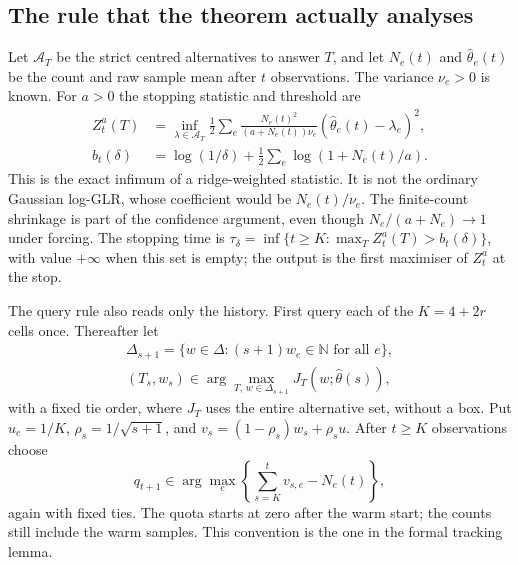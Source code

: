 \subsection{The rule that the theorem actually analyses}
Let $\mathcal A_T$ be the strict centred alternatives to answer $T$, and let $N_e(t)$ and
$\widehat\theta_e(t)$ be the count and raw sample mean after $t$ observations. The variance
$\nu_e>0$ is known. For $a>0$ the stopping statistic and threshold are
\begin{align}
Z_t^a(T)&=\inf_{\lambda\in\mathcal A_T}
 \frac12\sum_e\frac{N_e(t)^2}{(a+N_e(t))\nu_e}
 (\widehat\theta_e(t)-\lambda_e)^2,\label{eq:ridgestop}\\
b_t(\delta)&=\log(1/\delta)+\frac12\sum_e\log(1+N_e(t)/a).
\label{eq:idealboundary}
\end{align}
This is the exact infimum of a ridge-weighted statistic. It is not the ordinary Gaussian
log-GLR, whose coefficient would be $N_e(t)/\nu_e$. The finite-count shrinkage is part of
the confidence argument, even though $N_e/(a+N_e)\to1$ under forcing.
The stopping time is
$\tau_\delta=\inf\{t\ge K:\max_T Z_t^a(T)>b_t(\delta)\}$, with value $+\infty$ when this set
is empty; the output is the first maximiser of $Z_t^a$ at the stop.

The query rule also reads only the history. First query each of the $K=4+2r$ cells once.
Thereafter let
\begin{gather*}
\Delta_{s+1}=\{w\in\Delta:(s+1)w_e\in\mathbb N\text{ for all }e\},\\
(T_s,w_s)\in\arg\max_{T,\,w\in\Delta_{s+1}}J_T(w;\widehat\theta(s)),
\end{gather*}
with a fixed tie order, where $J_T$ uses the entire alternative set, without a box.
Put $u_e=1/K$, $\rho_s=1/\sqrt{s+1}$, and $v_s=(1-\rho_s)w_s+\rho_su$.
After $t\ge K$ observations choose
\[
q_{t+1}\in\arg\max_e\left\{\sum_{s=K}^{t}v_{s,e}-N_e(t)\right\},
\]
again with fixed ties. The quota starts at zero after the warm start; the counts still
include the warm samples. This convention is the one in the formal tracking lemma.

